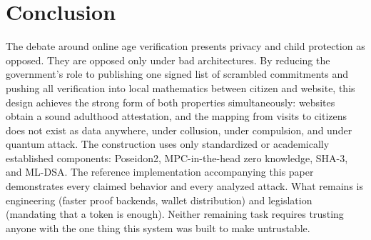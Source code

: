 \documentclass[11pt]{article}
\theoremstyle{definition}
\begin{document}
\section{Conclusion}

The debate around online age verification presents privacy and child protection as
opposed. They are opposed only under bad architectures. By reducing the government's role
to publishing one signed list of scrambled commitments and pushing all verification into
local mathematics between citizen and website, this design achieves the strong form of
both properties simultaneously: websites obtain a sound adulthood attestation, and the
mapping from visits to citizens does not exist as data anywhere, under collusion, under
compulsion, and under quantum attack. The construction uses only standardized or
academically established components: Poseidon2, MPC-in-the-head zero knowledge, SHA-3,
and ML-DSA. The reference implementation accompanying this paper demonstrates every
claimed behavior and every analyzed attack. What remains is engineering (faster proof
backends, wallet distribution) and legislation (mandating that a token is enough). Neither
remaining task requires trusting anyone with the one thing this system was built to make
untrustable.



\end{document}
